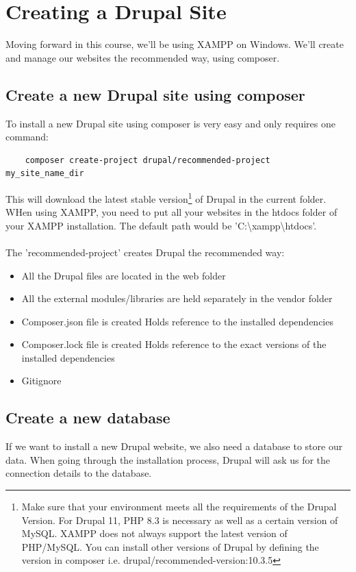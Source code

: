 \chapter{Creating a Drupal Site}
\label{ch:creating_a_drupal_site}

Moving forward in this course, we'll be using XAMPP on Windows. We'll create and manage our websites the recommended way, using composer.

\section{Create a new Drupal site using composer}
To install a new Drupal site using composer is very easy and only requires one command:

\begin{verbatim}
    composer create-project drupal/recommended-project my_site_name_dir
\end{verbatim}

This will download the latest stable version\footnote{Make sure that your environment meets all the requirements of the Drupal Version. For Drupal 11, PHP 8.3 is necessary as well as a certain version of MySQL. XAMPP does not always support the latest version of PHP/MySQL. You can install other versions of Drupal by defining the version in composer i.e. drupal/recommended-version:10.3.5} of Drupal in the current folder. WHen using XAMPP, you need to put all your websites in the htdocs folder of your XAMPP installation. The default path would be 'C:\textbackslash xampp\textbackslash htdocs'.
\\\\
The 'recommended-project' creates Drupal the recommended way:
\begin{itemize}
    \item All the Drupal files are located in the web folder
    \item All the external modules/libraries are held separately in the vendor folder
    \item Composer.json file is created
    \subitem Holds reference to the installed dependencies
    \item	Composer.lock file is created
    \subitem Holds reference to the exact versions of the installed dependencies
   \item Gitignore 
\end{itemize}

\section{Create a new database}
If we want to install a new Drupal website, we also need a database to store our data. When going through the installation process, Drupal will ask us for the connection details to the database.

